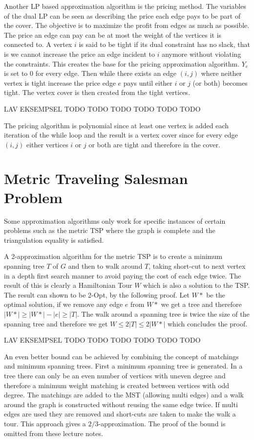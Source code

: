 Another LP based approximation algorithm is the pricing method. The variables of the dual LP can be seen as describing the price each edge pays to be part of the cover. The objective is to maximize the profit from edges as much as possible. The price an edge can pay can be at most the weight of the vertices it is connected to. A vertex $i$ is said to be tight if its dual constraint has no slack, that is we cannot increase the price an edge incident to $i$ anymore without violating the constraints. This creates the base for the pricing approximation algorithm. $Y_e$ is set to 0 for every edge. Then while there exists an edge $(i,j)$ where neither vertex is tight increase the price edge $e$ pays until either $i$ or $j$ (or both) becomes tight. The vertex cover is then created from the tight vertices.

\newpar LAV EKSEMPSEL TODO TODO TODO TODO TODO TODO

\newpar The pricing algorithm is polynomial since at least one vertex is added each iteration of the while loop and the result is a vertex cover since for every edge $(i,j)$ either vertices $i$ or $j$ or both are tight and therefore in the cover. 

\section{Metric Traveling Salesman Problem}
Some approximation algorithms only work for specific instances of certain problems such as the metric TSP where the graph is complete and the triangulation equality is satisfied. 

A 2-approximation algorithm for the metric TSP is to create a minimum spanning tree $T$ of $G$ and then to walk around $T$, taking short-cut to next vertex in a depth first search manner to avoid paying the cost of each edge twice. The result of this is clearly a Hamiltonian Tour $W$ which is also a solution to the TSP. The result can shown to be 2-Opt, by the following proof. Let $W*$ be the optimal solution, if we remove any edge $e$ from $W*$ we get a tree and therefore $|W*| \ge |W*| - |e| \ge |T|$. The walk around a spanning tree is twice the size of the spanning tree and therefore we get $W \le 2|T| \le 2|W*|$ which concludes the proof.
 
\newpar LAV EKSEMPSEL TODO TODO TODO TODO TODO TODO

\newpar An even better bound can be achieved by combining the concept of matchings and minimum spanning trees. First a minimum spanning tree is generated. In a tree there can only be an even number of vertices with uneven degree and therefore a minimum weight matching is created between vertices with odd degree. The matchings are added to the MST (allowing multi edges) and a walk around the graph is constructed without reusing the same edge twice. If multi edges are used they are removed and short-cuts are taken to make the walk a tour. This approach gives a $2/3$-approximation. The proof of the bound is omitted from these lecture notes.

